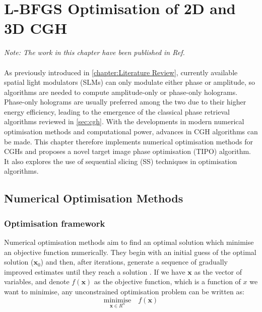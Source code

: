 \chapter{L-BFGS Optimisation of 2D and 3D CGH}
\label{chapter:L-BFGS Optimisation of Phase-Only Hologram}

\graphicspath{{Chapter_Optim_CGH/Figs/}}

\textit{Note: The work in this chapter have been published in Ref. \cite{Sha2022,Sha2023}}\\\\


As previously introduced in \cref{chapter:Literature Review}, currently available spatial light modulators (SLMs) can only modulate either phase or amplitude, so algorithms are needed to compute amplitude-only or phase-only holograms. Phase-only holograms are usually preferred among the two due to their higher energy efficiency, leading to the emergence of the classical phase retrieval algorithms reviewed in \cref{sec:cgh}. With the developments in modern numerical optimisation methods and computational power, advances in CGH algorithms can be made. This chapter therefore implements numerical optimisation methods for CGHs and proposes a novel target image phase optimisation (TIPO) algorithm. It also explores the use of sequential slicing (SS) techniques in optimisation algorithms.

\section{Numerical Optimisation Methods} \label{sec:Numerical Optimisation Methods}

\subsection{Optimisation framework} \label{sec:Optimisation framework}
Numerical optimisation methods aim to find an optimal solution which minimise an objective function numerically. They begin with an initial guess of the optimal solution ($\textbf{x}_{0}$) and then, after iterations, generate a sequence of gradually improved estimates until they reach a solution \cite{Nocedal2006}. If we have $\textbf{x}$ as the vector of variables, and denote $f(\textbf{x})$ as the objective function, which is a function of $x$ we want to minimise, any unconstrained optimisation problem can be written as:
\begin{equation}
  \underset{\textbf{x}\in R^n}{\text{minimise}}\quad f(\textbf{x})
  \label{eq:minimise_F}
\end{equation}

